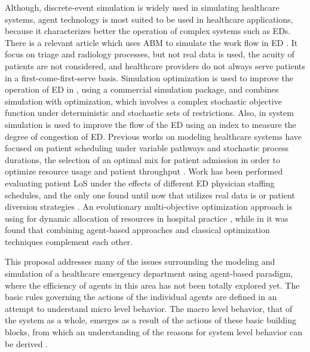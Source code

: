 \documentclass[11pt]{article} %
\begin{document}
Although, discrete-event simulation is widely used in simulating healthcare systems, agent technology is most suited to be used in 
healthcare applications, because it characterizes better the operation of complex systems such as EDs. 
There is a relevant article which uses ABM to simulate the work flow in ED \cite{Lu:2009p19}. It focus on triage and radiology processes, but not real data is used, the acuity of patients are not considered, and healthcare providers do not always serve patients in a first-come-first-serve basis.
Simulation optimization is used to improve the operation of ED in \cite{Ruohonen:2006p453}, using a commercial simulation package, and \cite{Ahmed:2009p936} combines simulation with optimization, which involves a complex stochastic objective function under deterministic and stochastic sets of restrictions. Also, in \cite{Weng:2011p1231} system simulation is used to improve the flow of the ED using an index to measure the degree of congestion of ED.
Previous works on modeling healthcare systems have focused on patient scheduling under variable pathways and stochastic process 
durations, the selection of an optimal mix for patient admission in order to optimize resource usage and patient throughput 
\cite{Hutzschenreuter:2008p42}. Work has been performed evaluating patient LoS under the effects of different ED physician 
staffing schedules, and the only one found until now that utilizes real data is \cite{Jones:2008p338} or patient diversion strategies 
\cite{Laskowski:2008p25}.
An evolutionary multi-objective optimization approach is using for dynamic allocation of resources in hospital practice 
\cite{Hutzschenreuter:2009p320}, while in \cite{Persson:2005p260} it was found that  combining agent-based approaches and 
classical optimization techniques complement each other. 

This proposal addresses many of the issues surrounding the modeling and simulation of a healthcare emergency department using 
agent-based paradigm, where the efficiency of agents in this area has not been totally explored yet. The basic rules governing the 
actions of the individual agents are defined in an attempt to understand micro level behavior. The macro level behavior, that of the 
system as a whole, emerges as a result of the actions of these basic building blocks, from which an understanding of the reasons for 
system level behavior can be derived \cite{Stainsby:2009p536}. \\

\end{document}
